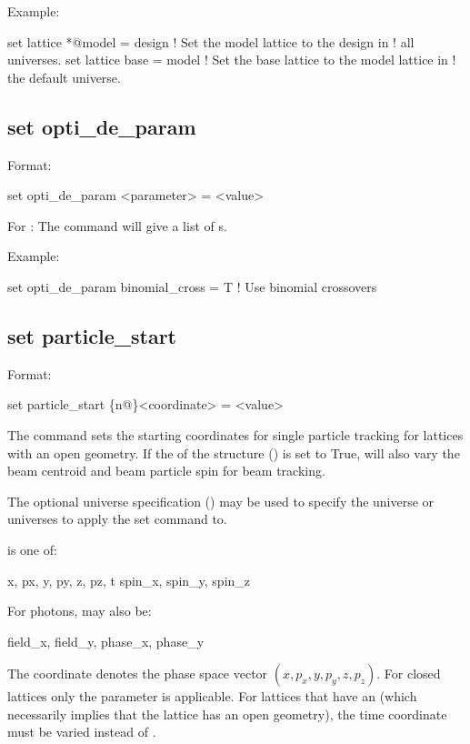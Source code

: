 {{Example:
\begin{example}
  set lattice *@model = design  ! Set the model lattice to the design in 
                                !   all universes.
  set lattice base = model      ! Set the base lattice to the model lattice in 
                                !   the default universe.
\end{example}


\subsection{set opti_de_param}
\label{s:set.opti.de.param}

Format:
\begin{example}
  set opti_de_param <parameter> = <value>
\end{example}

For : The  command will give a list of s.

Example:
\begin{example}
  set opti_de_param binomial_cross = T  ! Use binomial crossovers 
\end{example}


\subsection{set particle_start}
\label{s:set.particle.start}

Format:
\begin{example}
  set particle_start \{n@\}<coordinate> = <value>
\end{example}
The  command sets the starting coordinates for single particle tracking for
lattices with an open geometry. If the  of the 
structure () is set to True,  will also vary the beam centroid
and beam particle spin for beam tracking.

The optional  universe specification () may be used to specify the universe
or universes to apply the set command to.

 is one of:
\begin{example}
  x, px, y, py, z, pz, t
  spin_x, spin_y, spin_z
\end{example}
For photons,  may also be:
\begin{example}
  field_x, field_y, phase_x, phase_y
\end{example}
The \vn{*} coordinate denotes the phase space vector $(x, p_x, y, p_y, z, p_z)$.  For closed
lattices only the  parameter is applicable. For lattices that have an  (which
necessarily implies that the lattice has an open geometry), the time  coordinate must be
varied instead of .

}}
